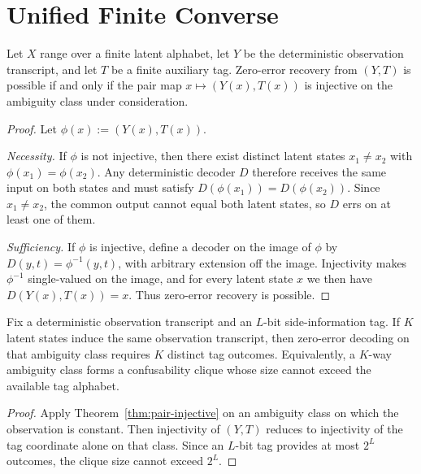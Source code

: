 \section{Unified Finite Converse}\label{sec:converse}

\begin{theorem}\label{thm:pair-injective}
Let $X$ range over a finite latent alphabet, let $Y$ be the deterministic observation transcript, and let $T$ be a finite auxiliary tag. Zero-error recovery from $(Y,T)$ is possible if and only if the pair map $x \mapsto (Y(x),T(x))$ is injective on the ambiguity class under consideration.
\end{theorem}

\begin{proof}
Let $\phi(x):=(Y(x),T(x))$.

\emph{Necessity.} If $\phi$ is not injective, then there exist distinct latent states $x_1\neq x_2$ with $\phi(x_1)=\phi(x_2)$. Any deterministic decoder $D$ therefore receives the same input on both states and must satisfy $D(\phi(x_1))=D(\phi(x_2))$. Since $x_1\neq x_2$, the common output cannot equal both latent states, so $D$ errs on at least one of them.

\emph{Sufficiency.} If $\phi$ is injective, define a decoder on the image of $\phi$ by $D(y,t)=\phi^{-1}(y,t)$, with arbitrary extension off the image. Injectivity makes $\phi^{-1}$ single-valued on the image, and for every latent state $x$ we then have $D(Y(x),T(x))=x$. Thus zero-error recovery is possible.
\end{proof}

\begin{theorem}\label{thm:confusability-converse}
Fix a deterministic observation transcript and an $L$-bit side-information tag. If $K$ latent states induce the same observation transcript, then zero-error decoding on that ambiguity class requires $K$ distinct tag outcomes. Equivalently, a $K$-way ambiguity class forms a confusability clique whose size cannot exceed the available tag alphabet.
\end{theorem}

\begin{proof}
Apply Theorem~\ref{thm:pair-injective} on an ambiguity class on which the observation is constant. Then injectivity of $(Y,T)$ reduces to injectivity of the tag coordinate alone on that class. Since an $L$-bit tag provides at most $2^L$ outcomes, the clique size cannot exceed $2^L$.
\end{proof}


